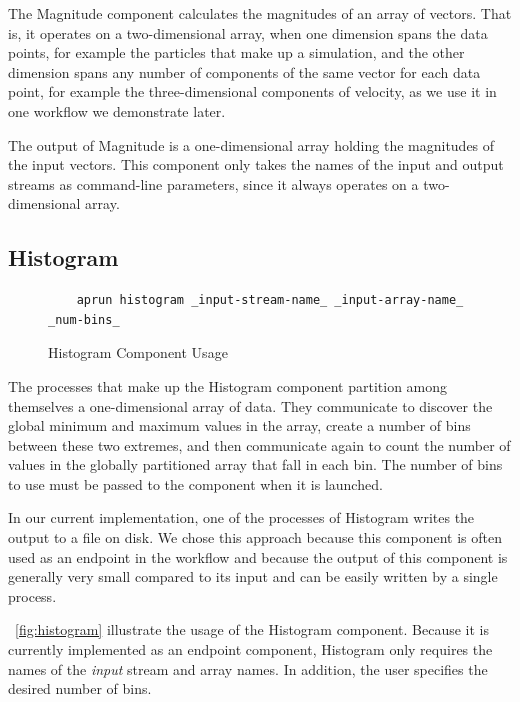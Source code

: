 The Magnitude component calculates the magnitudes
of an array of vectors. That is, it operates
on a two-dimensional array, when one dimension spans
the data points, for example the particles that
make up a simulation, and the other dimension spans any number
of components of the same vector for each data point, for example
the three-dimensional components of velocity,
as we use it in one workflow we demonstrate later.

The output of Magnitude is a one-dimensional array holding
the magnitudes of the input vectors. This \sys component
only takes the names of the input and output streams
as command-line parameters, since it always
operates on a two-dimensional array.

\subsection{Histogram}

\begin{figure}
  \begin{lstlisting}
    aprun histogram _input-stream-name_ _input-array-name_ _num-bins_
  \end{lstlisting}
  \caption{Histogram Component Usage}
  \label{fig:histogram}
\end{figure}

The processes that make up the Histogram component
partition among themselves a one-dimensional
array of data. They communicate to discover the global
minimum and maximum values in the array, create a
number of bins between these two extremes, and
then communicate again to count the number of values in the
globally partitioned array that fall in each bin.
The number of bins to use must be passed to the
component when it is launched.

In our current implementation, one of the processes
of Histogram writes the
output to a file on disk. We chose this approach
because this component is often used as an
endpoint in the workflow and because the output of this
component is generally very small compared to its input
and can be easily written by a single process.

~\autoref{fig:histogram} illustrate the usage of
the Histogram component. Because it is currently
implemented as an endpoint component, Histogram
only requires the names of the \textit{input}
stream and array names. In addition, the user
specifies the desired number of bins.

